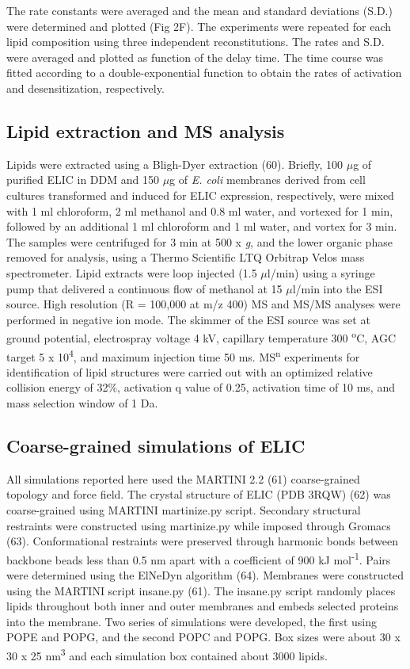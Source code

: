 The rate constants were averaged and the mean and standard deviations
(S.D.) were determined and plotted (Fig 2F). The experiments were
repeated for each lipid composition using three independent
reconstitutions. The rates and S.D. were averaged and plotted as
function of the delay time. The time course was fitted according to a
double-exponential function to obtain the rates of activation and
desensitization, respectively.

\subsection{Lipid extraction and MS analysis}

Lipids were extracted using a Bligh-Dyer extraction (60). Briefly, 100
$\mu$g of purified ELIC in DDM and 150 $\mu$g of \emph{E. coli} membranes
derived from cell cultures transformed and induced for ELIC expression,
respectively, were mixed with 1 ml chloroform, 2 ml methanol and 0.8 ml
water, and vortexed for 1 min, followed by an additional 1 ml chloroform
and 1 ml water, and vortex for 3 min. The samples were centrifuged for 3
min at 500 x \emph{g}, and the lower organic phase removed for analysis,
using a Thermo Scientific LTQ Orbitrap Velos mass spectrometer. Lipid
extracts were loop injected (1.5 $\mu$l/min) using a syringe pump that
delivered a continuous flow of methanol at 15 $\mu$l/min into the ESI
source. High resolution (R = 100,000 at m/z 400) MS and MS/MS analyses
were performed in negative ion mode. The skimmer of the ESI source was
set at ground potential, electrospray voltage 4 kV, capillary
temperature 300 \textsuperscript{o}C, AGC target 5 x
10\textsuperscript{4}, and maximum injection time 50 ms.
MS\textsuperscript{n} experiments for identification of lipid structures
were carried out with an optimized relative collision energy of 32\%,
activation q value of 0.25, activation time of 10 ms, and mass selection
window of 1 Da.

\subsection{Coarse-grained simulations of ELIC}

All simulations reported here used the MARTINI 2.2 (61) coarse-grained
topology and force field. The crystal structure of ELIC (PDB 3RQW) (62)
was coarse-grained using MARTINI martinize.py script. Secondary
structural restraints were constructed using martinize.py while imposed
through Gromacs (63). Conformational restraints were preserved through
harmonic bonds between backbone beads less than 0.5 nm apart with a
coefficient of 900 kJ mol\textsuperscript{-1}. Pairs were determined
using the ElNeDyn algorithm (64). Membranes were constructed using the
MARTINI script insane.py (61). The insane.py script randomly places
lipids throughout both inner and outer membranes and embeds selected
proteins into the membrane. Two series of simulations were developed,
the first using POPE and POPG, and the second POPC and POPG. Box sizes
were about 30 x 30 x 25 nm\textsuperscript{3} and each simulation box
contained about 3000 lipids.

